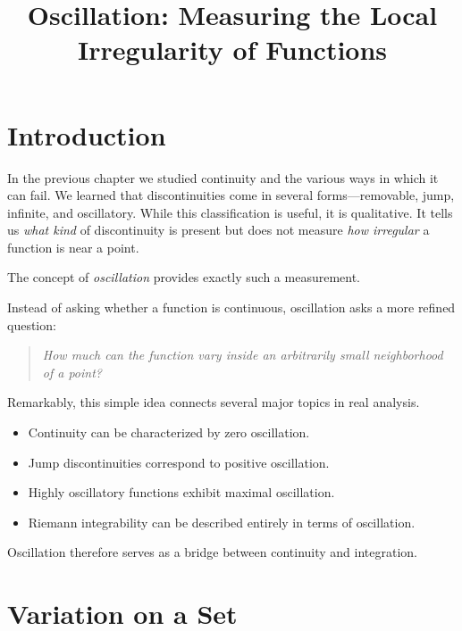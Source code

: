 \documentclass{essay}
\title{Oscillation: Measuring the Local Irregularity of Functions}
\author{}
\date{}
\begin{document}
\maketitle
\tableofcontents


\section{Introduction}

In the previous chapter we studied continuity and the various ways in which it
can fail. We learned that discontinuities come in several forms---removable,
jump, infinite, and oscillatory. While this classification is useful, it is
qualitative. It tells us \emph{what kind} of discontinuity is present but does
not measure \emph{how irregular} a function is near a point.

The concept of \emph{oscillation} provides exactly such a measurement.

Instead of asking whether a function is continuous, oscillation asks a more
refined question:

\begin{quote}
\emph{How much can the function vary inside an arbitrarily small neighborhood
of a point?}
\end{quote}

Remarkably, this simple idea connects several major topics in real analysis.

\begin{itemize}
\item Continuity can be characterized by zero oscillation.
\item Jump discontinuities correspond to positive oscillation.
\item Highly oscillatory functions exhibit maximal oscillation.
\item Riemann integrability can be described entirely in terms of oscillation.
\end{itemize}

Oscillation therefore serves as a bridge between continuity and integration.


\section{Variation on a Set}
\end{document}
